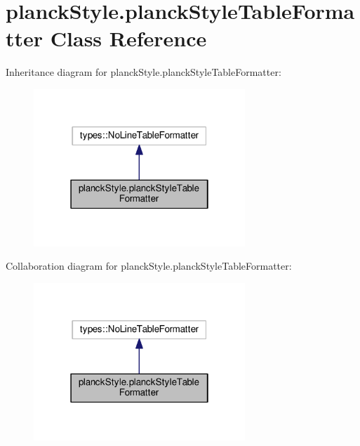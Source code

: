 \hypertarget{classplanckStyle_1_1planckStyleTableFormatter}{}\section{planck\+Style.\+planck\+Style\+Table\+Formatter Class Reference}
\label{classplanckStyle_1_1planckStyleTableFormatter}


Inheritance diagram for planck\+Style.\+planck\+Style\+Table\+Formatter\+:
\nopagebreak
\begin{figure}[H]
\begin{center}
\leavevmode
\includegraphics[width=226pt]{classplanckStyle_1_1planckStyleTableFormatter__inherit__graph}
\end{center}
\end{figure}


Collaboration diagram for planck\+Style.\+planck\+Style\+Table\+Formatter\+:
\nopagebreak
\begin{figure}[H]
\begin{center}
\leavevmode
\includegraphics[width=226pt]{classplanckStyle_1_1planckStyleTableFormatter__coll__graph}
\end{center}
\end{figure}
